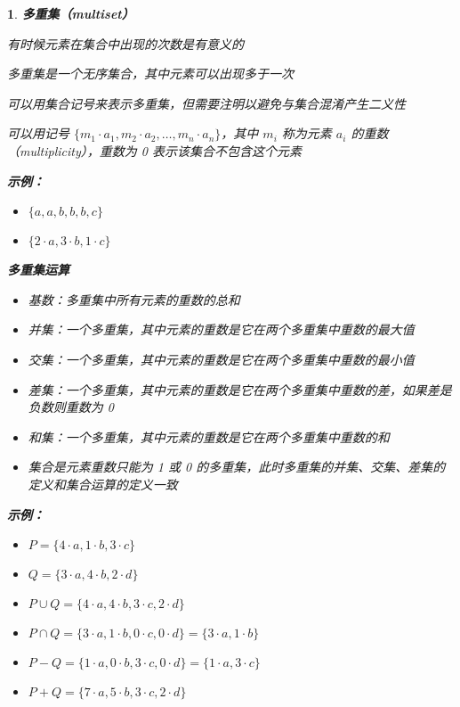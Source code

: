 \documentclass[UTF8]{report}
\theoremstyle{MyLineTheoremStyle} %
\theoremstyle{MyBlockTheoremStyle} %
\theoremstyle{MySubsubsectionStyle} %
\newtheorem{definition}{}
\begin{document}
\begin{definition}
    \textbf{多重集（multiset）}\par
    有时候元素在集合中出现的次数是有意义的\par
    多重集是一个无序集合，其中元素可以出现多于一次\par
    可以用集合记号来表示多重集，但需要注明以避免与集合混淆产生二义性\par
    可以用记号 $\{m_1 \cdot a_1, m_2 \cdot a_2, \ldots, m_n \cdot a_n\}$，其中 $m_i$ 称为元素 $a_i$ 的重数（multiplicity），重数为 0 表示该集合不包含这个元素\par

    \textbf{示例：}\par
    \begin{itemize}
        \item $\{a, a, b, b, b, c\}$
        \item $\{2 \cdot a, 3 \cdot b, 1 \cdot c\}$
    \end{itemize}

    \textbf{多重集运算}\par
    \begin{itemize}
        \item 基数：多重集中所有元素的重数的总和
        \item 并集：一个多重集，其中元素的重数是它在两个多重集中重数的最大值
        \item 交集：一个多重集，其中元素的重数是它在两个多重集中重数的最小值
        \item 差集：一个多重集，其中元素的重数是它在两个多重集中重数的差，如果差是负数则重数为 0
        \item 和集：一个多重集，其中元素的重数是它在两个多重集中重数的和
        \item 集合是元素重数只能为 1 或 0 的多重集，此时多重集的并集、交集、差集的定义和集合运算的定义一致
    \end{itemize}

    \textbf{示例：}\par
    \begin{itemize}
        \item $P = \{4 \cdot a, 1 \cdot b, 3 \cdot c\}$
        \item $Q = \{3 \cdot a, 4 \cdot b, 2 \cdot d\}$
        \item $P \cup Q = \{4 \cdot a, 4 \cdot b, 3 \cdot c, 2 \cdot d\}$
        \item $P \cap Q = \{3 \cdot a, 1 \cdot b, 0 \cdot c, 0 \cdot d\} = \{3 \cdot a, 1 \cdot b\}$
        \item $P - Q = \{1 \cdot a, 0 \cdot b, 3 \cdot c, 0 \cdot d\} = \{1 \cdot a, 3 \cdot c\}$
        \item $P + Q = \{7 \cdot a, 5 \cdot b, 3 \cdot c, 2 \cdot d\}$
    \end{itemize}
\end{definition}
\end{document}
